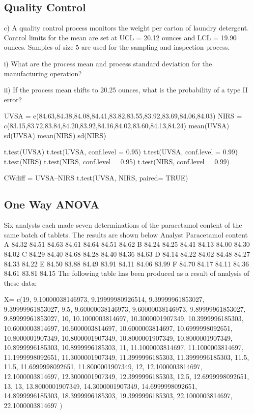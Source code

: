 


\subsection{Quality Control}
c) A quality control process monitors the weight per carton of laundry detergent. 
Control limits for the mean are set at UCL = 20.12 ounces and LCL = 19.90 ounces. 
Samples of size 5 are used for the sampling and inspection process.

i) What are the process mean and process standard deviation for the manufacturing operation?

ii) If the process mean shifts to 20.25 ounces, what is the probability of a type II error? 	
   


UVSA = c(84.63,84.38,84.08,84.41,83.82,83.55,83.92,83.69,84.06,84.03) 
NIRS = c(83.15,83.72,83.84,84.20,83.92,84.16,84.02,83.60,84.13,84.24)
mean(UVSA)
sd(UVSA)
mean(NIRS)
sd(NIRS)


t.test(UVSA)
t.test(UVSA, conf.level = 0.95)
t.test(UVSA, conf.level = 0.99)
t.test(NIRS)
t.test(NIRS, conf.level = 0.95)
t.test(NIRS, conf.level = 0.99)

CWdiff = UVSA–NIRS
t.test(UVSA, NIRS, paired= TRUE)


\subsection{One Way ANOVA}

Six analysts each made seven determinations of the paracetamol content of the same batch of tablets.
The results are shown below
Analyst Paracetamol content
A 84.32 84.51 84.63 84.61 84.64 84.51 84.62
B 84.24 84.25 84.41 84.13 84.00 84.30 84.02
C 84.29 84.40 84.68 84.28 84.40 84.36 84.63
D 84.14 84.22 84.02 84.48 84.27 84.33 84.22
E 84.50 83.88 84.49 83.91 84.11 84.06 83.99
F 84.70 84.17 84.11 84.36 84.61 83.81 84.15
The following table has been produced as a result of analysis of these data:




X= c(19, 9.10000038146973, 9.19999980926514, 9.39999961853027, 9.39999961853027, 
9.5, 9.60000038146973, 9.60000038146973, 9.89999961853027, 9.89999961853027, 
10, 10.1000003814697, 10.3000001907349, 10.3999996185303, 10.6000003814697, 
10.6000003814697, 10.6000003814697, 10.6999998092651, 10.8000001907349, 
10.8000001907349, 10.8000001907349, 10.8000001907349, 10.8999996185303, 
10.8999996185303, 11, 11.1000003814697, 11.1000003814697, 11.1999998092651, 
11.3000001907349, 11.3999996185303, 11.3999996185303, 11.5, 11.5, 
11.6999998092651, 11.8000001907349, 12, 12.1000003814697, 12.1000003814697, 
12.3000001907349, 12.3999996185303, 12.5, 12.6999998092651, 13, 
13, 13.8000001907349, 14.3000001907349, 14.6999998092651, 14.8999996185303, 
18.3999996185303, 19.3999996185303, 22.1000003814697, 22.1000003814697
)


